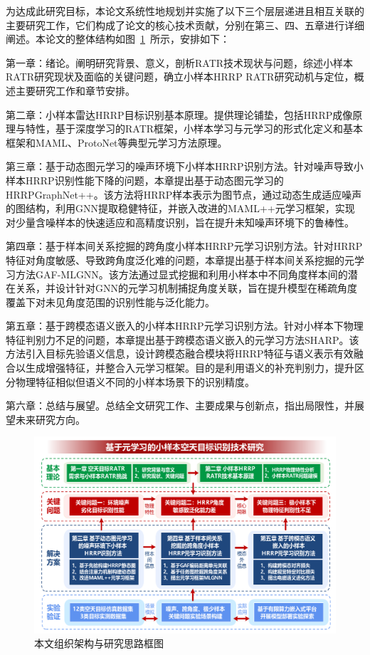 为达成此研究目标，本论文系统性地规划并实施了以下三个层层递进且相互关联的主要研究工作，它们构成了论文的核心技术贡献，分别在第三、四、五章进行详细阐述。本论文的整体结构如图~\ref{fig:framework}~所示，安排如下：

第一章：绪论。阐明研究背景、意义，剖析RATR技术现状与问题，综述小样本RATR研究现状及面临的关键问题，确立小样本HRRP RATR研究动机与定位，概述主要研究工作和章节安排。

第二章：小样本雷达HRRP目标识别基本原理。提供理论铺垫，包括HRRP成像原理与特性，基于深度学习的RATR框架，小样本学习与元学习的形式化定义和基本框架和MAML、ProtoNet等典型元学习方法原理。

第三章：基于动态图元学习的噪声环境下小样本HRRP识别方法。针对噪声导致小样本HRRP识别性能下降的问题，本章提出基于动态图元学习的HRRPGraphNet++。该方法将HRRP样本表示为图节点，通过动态生成适应噪声的图结构，利用GNN提取稳健特征，并嵌入改进的MAML++元学习框架，实现对少量含噪样本的快速适应和高精度识别，旨在提升未知噪声环境下的鲁棒性。

第四章：基于样本间关系挖掘的跨角度小样本HRRP元学习识别方法。针对HRRP特征对角度敏感、导致跨角度泛化难的问题，本章提出基于样本间关系挖掘的元学习方法GAF-MLGNN。该方法通过显式挖掘和利用小样本中不同角度样本间的潜在关系，并设计针对GNN的元学习机制捕捉角度关联，旨在提升模型在稀疏角度覆盖下对未见角度范围的识别性能与泛化能力。

第五章：基于跨模态语义嵌入的小样本HRRP元学习识别方法。针对小样本下物理特征判别力不足的问题，本章提出基于跨模态语义嵌入的元学习方法SHARP。该方法引入目标先验语义信息，设计跨模态融合模块将HRRP特征与语义表示有效融合以生成增强特征，并整合入元学习框架。目的是利用语义的补充判别力，提升区分物理特征相似但语义不同的小样本场景下的识别精度。

第六章：总结与展望。总结全文研究工作、主要成果与创新点，指出局限性，并展望未来研究方向。

\begin{figure}[h!] %
    \centering
    \includegraphics[width=\linewidth]{figures/general.pdf} %
    \caption{本文组织架构与研究思路框图}
    \label{fig:framework}
\end{figure}